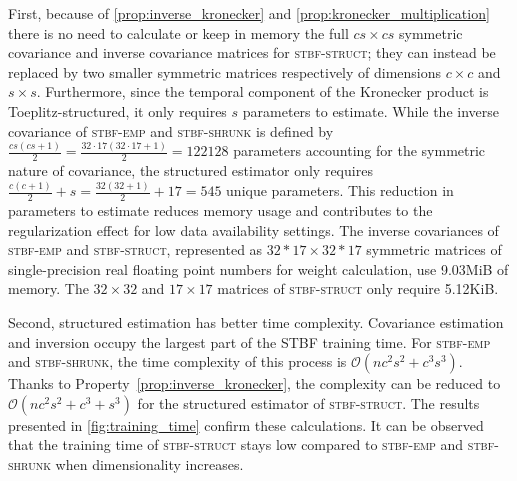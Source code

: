 \begin{refsection}
	First, because of \autoref{prop:inverse_kronecker} and
	\autoref{prop:kronecker_multiplication} there is no need to calculate or keep in memory the full $cs\times cs$
	symmetric covariance and inverse covariance matrices for \textsc{stbf-struct}; they can instead be replaced by two smaller symmetric matrices respectively of dimensions $c\times c$ and $s\times s$.
	Furthermore, since the temporal component of the Kronecker product is
	Toeplitz-structured, it only requires $s$ parameters to
	estimate.
	While the inverse covariance of \textsc{stbf-emp} and \textsc{stbf-shrunk} is
	defined by $\frac{cs(cs+1)}{2}=\frac{32\cdot17(32\cdot17+1)}{2}=\num{122128}$
	parameters accounting for the symmetric nature of
	covariance, the structured estimator only requires $\frac{c(c+1)}{2} + s =
		\frac{32(32+1)}{2} + 17=545$ unique parameters.
	This reduction in parameters to estimate reduces memory usage and contributes to the regularization effect for low data availability settings.
	The inverse covariances of \textsc{stbf-emp} and
	\textsc{stbf-struct}, represented as $32*17\times 32*17$ symmetric matrices of
	single-precision real floating point numbers for weight calculation,
	use 9.03MiB of memory.
	The $32\times 32$ and $17\times 17$ matrices of \textsc{stbf-struct} only
	require 5.12KiB.

	Second, structured estimation has better time complexity.
	Covariance estimation and inversion occupy the largest part of the STBF training time.
	For \textsc{stbf-emp} and \textsc{stbf-shrunk}, the time complexity of this process is $\mathcal{O}(nc^2s^2+c^3s^3)$.
	Thanks to Property~\ref{prop:inverse_kronecker}, the complexity can be reduced to
	$\mathcal{O}(nc^2s^2+c^3+s^3)$ for the structured estimator of \textsc{stbf-struct}.
	The results presented in \autoref{fig:training_time} confirm these
	calculations.
	It can be observed that the training time of \textsc{stbf-struct} stays low compared to \textsc{stbf-emp} and \textsc{stbf-shrunk} when dimensionality increases.


\end{refsection}
